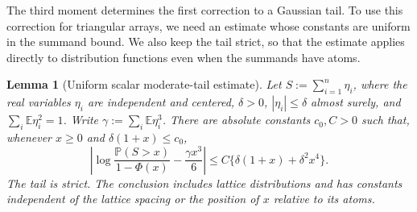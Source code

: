 \documentclass[11pt,letterpaper]{article}
\newtheorem{lemma}{Lemma}
\theoremstyle{remark}
\newcommand{\E}{\mathbb E}
\newcommand{\Pp}{\mathbb P}
\begin{document}
The third moment determines the first correction to a Gaussian
tail. To use this correction for triangular arrays, we need an
estimate whose constants are uniform in the summand bound. We
also keep the tail strict, so that the estimate applies directly
to distribution functions even when the summands have atoms.

\begin{lemma}[Uniform scalar moderate-tail estimate]
\label{opt:moderate-tail}
Let $S:=\sum_{i=1}^n\eta_i$, where the real variables $\eta_i$ are
independent and centered, $\delta>0$, $|\eta_i|\le\delta$
almost surely, and $\sum_i\E\eta_i^2=1$. Write
$\gamma:=\sum_i\E\eta_i^3$. There are absolute constants $c_0,C>0$
such that, whenever $x\ge0$ and $\delta(1+x)\le c_0$,
\begin{equation}
 \left|\log\frac{\Pp(S>x)}{1-\Phi(x)}
       -\frac{\gamma x^3}{6}\right|
 \le C\{\delta(1+x)+\delta^2x^4\}.
 \label{opt:moderate-tail-formula}
\end{equation}
The tail is strict. The conclusion includes lattice distributions and
has constants independent of the lattice spacing or the position of
$x$ relative to its atoms.
\end{lemma}
\end{document}
